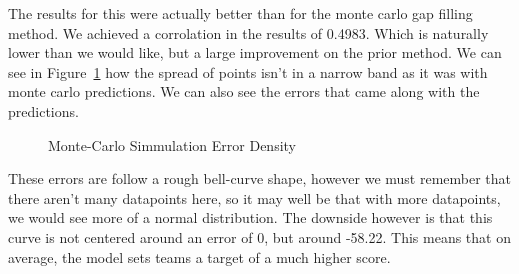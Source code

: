 The results for this were actually better than for the monte carlo gap filling method. We achieved a corrolation in the results of 0.4983. Which is naturally lower than we would like, but a large improvement 
on the prior method. We can see in Figure~\ref{DLSError} how the spread of points isn't in a narrow band as it was with monte carlo predictions. We can also see the errors that came along with the predictions.

\begin{figure}[h]
    \centering
    \qquad
    \caption{Monte-Carlo Simmulation Error Density}
    \label{DLSError}
\end{figure}


These errors are follow a rough bell-curve shape, however we must remember that there aren't many datapoints here, so it may well be that with more datapoints, we would see more of a normal distribution. The downside however is 
that this curve is not centered around an error of 0, but around -58.22. This means that on average, the model sets teams a target of a much higher score. 

